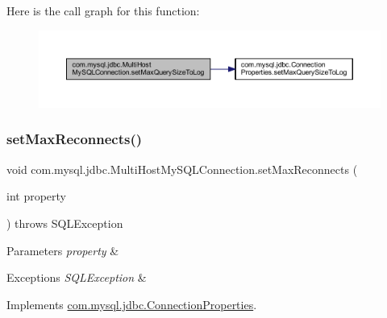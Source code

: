 Here is the call graph for this function\+:
\nopagebreak
\begin{figure}[H]
\begin{center}
\leavevmode
\includegraphics[width=350pt]{classcom_1_1mysql_1_1jdbc_1_1_multi_host_my_s_q_l_connection_af7d68fcc0013bf2144e290097365b6ea_cgraph}
\end{center}
\end{figure}
\mbox{\label{classcom_1_1mysql_1_1jdbc_1_1_multi_host_my_s_q_l_connection_a3f763d84919c40ae00d9d76bc53ac78e}} 
\subsubsection{\texorpdfstring{set\+Max\+Reconnects()}{setMaxReconnects()}}
{\footnotesize\ttfamily void com.\+mysql.\+jdbc.\+Multi\+Host\+My\+S\+Q\+L\+Connection.\+set\+Max\+Reconnects (\begin{DoxyParamCaption}\item[{int}]{property }\end{DoxyParamCaption}) throws S\+Q\+L\+Exception}


\begin{DoxyParams}{Parameters}
{\em property} & \\
\hline
\end{DoxyParams}

\begin{DoxyExceptions}{Exceptions}
{\em S\+Q\+L\+Exception} & \\
\hline
\end{DoxyExceptions}


Implements \mbox{\hyperlink{interfacecom_1_1mysql_1_1jdbc_1_1_connection_properties_aa4dbdf7b74fc014b67992de0cf9247c9}{com.\+mysql.\+jdbc.\+Connection\+Properties}}.

